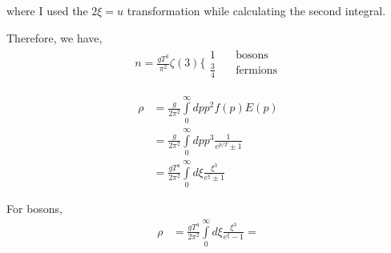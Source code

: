 where I used the $2\xi = u$ transformation while calculating the second integral.

Therefore, we have,
\begin{align}
    n = \frac{gT^{3}}{\pi^{2}}\zeta\left(3\right)
    \Bigg\{
    \begin{split}
    1\quad &\text{bosons}\\
    \frac{3}{4}\quad &\text{fermions}
    \end{split}
\end{align}

\begin{align}
    \rho &= \frac{g}{2\pi^{2}}\int\limits_{0}^{\infty} dp p^{2}f\left(p\right)E\left(p\right)\\
    &= \frac{g}{2\pi^{2}}\int\limits_{0}^{\infty} dp p^{3}\frac{1}{e^{p/T} \pm 1}\\
    &= \frac{gT^{4}}{2\pi^{2}}\int\limits_{0}^{\infty} d\xi \frac{\xi^{3}}{e^{\xi} \pm 1}
\end{align}

For bosons,
\begin{align}
    \rho &= \frac{gT^{4}}{2\pi^{2}}\int\limits_{0}^{\infty}d\xi \frac{\xi^{3}}{e^{\xi} - 1} = 
\end{align}